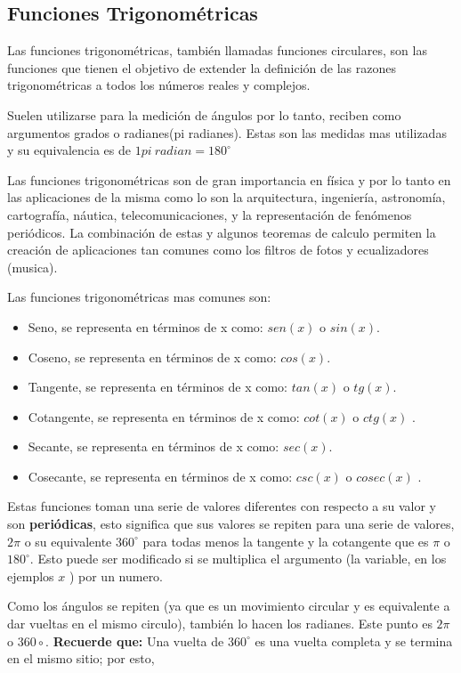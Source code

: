 \subsection{Funciones Trigonométricas}

Las funciones trigonométricas, también llamadas funciones circulares, son las
funciones que tienen el objetivo de
extender la definición de las razones trigonométricas a todos los números
reales y complejos.

Suelen utilizarse para la medición de ángulos por lo tanto, reciben como
argumentos grados o radianes(pi radianes). Estas son las medidas mas utilizadas
y su equivalencia es de $ 1 pi\ radian = 180^\circ $

Las funciones trigonométricas son de gran importancia en física y por lo tanto
en las aplicaciones de la misma como lo son la arquitectura, ingeniería, astronomía,
cartografía, náutica, telecomunicaciones, y la representación de fenómenos
periódicos. La combinación de estas y algunos teoremas de calculo permiten la
creación de aplicaciones tan comunes como los filtros de fotos y ecualizadores
(musica).

Las funciones trigonométricas mas comunes son:
\begin{itemize}
    \item Seno, se representa en términos de x como: $ sen(x) $ o $ sin(x) $.
    \item Coseno, se representa en términos de x como: $cos(x)$.
    \item Tangente, se representa en términos de x como: $ tan(x) $ o $ tg(x) $.
    \item Cotangente, se representa en términos de x como: $ cot(x) $ o $ ctg(x) $  .
    \item Secante, se representa en términos de x como: $ sec(x) $.
    \item Cosecante, se representa en términos de x como: $ csc(x) $ o $ cosec(x) $  .
\end{itemize}

Estas funciones toman una serie de valores diferentes con respecto a su valor y
son \textbf{periódicas}, esto significa que sus valores se repiten para una serie
de valores,  $2\pi $  o su equivalente $ 360^\circ $ para todas menos la tangente
y la cotangente que es $\pi$ o $180^\circ$. Esto puede ser
modificado si se multiplica el argumento (la variable, en los ejemplos $ x $  )
por un numero.

Como los ángulos se repiten (ya que es un movimiento circular y es equivalente a
dar vueltas en el mismo circulo), también lo hacen los radianes. Este punto es
$2\pi $ o $ 360\circ $. \textbf{Recuerde que:} Una vuelta de $ 360^\circ $ es una
vuelta completa y se termina en el mismo sitio; por esto,

